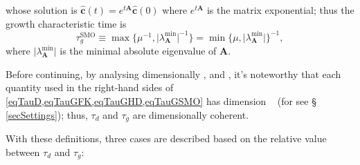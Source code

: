 \documentclass{article}
\begin{document}
\begin{description}
\begin{equation*}
                    \end{equation*}
                    whose solution is $\hat{\mathbf c}(t)=e^{t\mathbf A}\hat{\mathbf c}(0)$ \cite{ODEArnold1992} where $e^{t\mathbf A}$ is the matrix exponential; thus the growth characteristic time is
                    \begin{equation}
                        \tau_g^{\text{SMO}}\equiv
                        \max\{\mu^{-1},\vert\lambda^{\text{min}}_{\mathbf A}\vert^{-1}\}=
                        \min\{\mu,\vert\lambda^{\text{min}}_{\mathbf A}\vert\}^{-1},
                        \label{eqTauGSMO}
                    \end{equation}
                    where $\vert\lambda^{\text{min}}_{\mathbf A}\vert$ is the minimal absolute eigenvalue of $\mathbf A$.

                \end{description}

                Before continuing, by analysing dimensionally \FKdiscrete{}, \HDdiscrete{} and \SMOdiscrete{}, it's noteworthy that each quantity used in the right-hand sides of \cref{eqTauD,eqTauGFK,eqTauGHD,eqTauGSMO} has dimension \unit{\per\year} (for \unit{\year} see § \ref{secSettings}); thus, $\tau_d$ and $\tau_g$ are dimensionally coherent.

                With these definitions, three cases are described based on the relative value between $\tau_d$ and $\tau_g$:
\end{document}

